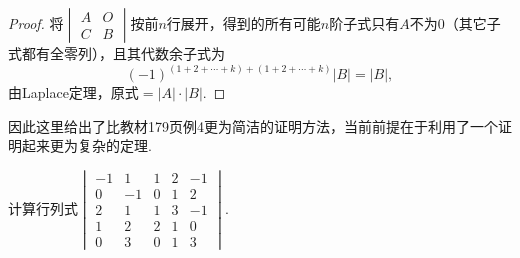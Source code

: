 \begin{proof}
    将$\begin{vmatrix}
            A & O \\
            C & B
        \end{vmatrix}$按前$n$行展开，得到的所有可能$n$阶子式只有$A$不为0（其它子式都有全零列），且其代数余子式为
    \[(-1)^{(1+2+\cdots+k)+(1+2+\cdots+k)}|B|=|B|,\]
    由Laplace定理，原式$=|A|\cdot|B|$.
\end{proof}

因此这里给出了比教材179页例4更为简洁的证明方法，当前前提在于利用了一个证明起来更为复杂的定理.

\begin{example}{}{}
    计算行列式$\begin{vmatrix}
            -1 & 1  & 1 & 2 & -1 \\
            0  & -1 & 0 & 1 & 2  \\
            2  & 1  & 1 & 3 & -1 \\
            1  & 2  & 2 & 1 & 0  \\
            0  & 3  & 0 & 1 & 3
        \end{vmatrix}$.
\end{example}

